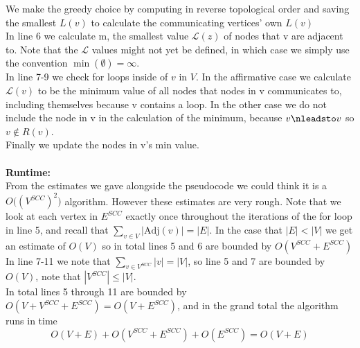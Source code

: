 \documentclass{article}
\theoremstyle{remark}
\numberwithin{equation}{section}
\begin{document}
We make the greedy choice by computing in reverse topological order and saving the smallest $L(v)$ to calculate the communicating vertices' own $L(v)$\\
In line 6 we calculate m, the smallest value $\mathcal{L}(z)$ of nodes that v are adjacent to. Note that the $\mathcal{L}$ values might not yet be defined, in which case we simply use the convention $\min(\emptyset)=\infty$.\\
In line 7-9 we check for loops inside of $v$ in $V$. In the affirmative case we calculate $\mathcal{L}(v)$ to be the minimum value of all nodes that nodes in v communicates to, including themselves because v contains a loop. In the other case we do not include the node in v in the calculation of the minimum, because $v \nleadsto v$ so $v \notin R(v)$.\\
Finally we update the  nodes  in v's min value.\\
\\
\textbf{Runtime:}\\ From the estimates we gave alongside the pseudocode we could think it is a $O\big((V^{SCC})^2\big)$ algorithm. However these estimates are very rough.
Note that we look at each vertex in $E^{SCC}$ exactly once throughout the iterations of the for loop in line 5, and recall that $\sum_{v\in V}|\text{Adj}(v)|=|E|$. In the case that $|E|<|V|$ we get an estimate of $O(V)$ so in total lines 5 and 6 are bounded by $O(V^{SCC}+E^{SCC})$\\
In line 7-11 we note that $\sum_{v\in V^{SCC}}|v|=|V|$, so line 5 and 7 are bounded by $O(V)$, note that $|V^{SCC}|\leq|V|$.\\
In total lines 5 through 11 are bounded by $O(V+V^{SCC}+E^{SCC}) = O(V+E^{SCC})$, and in the grand total the algorithm runs in time
\begin{equation}
	O(V+E)+O(V^{SCC}+E^{SCC})+O(E^{SCC})=O(V+E)
\end{equation}

     
	
\end{document}
